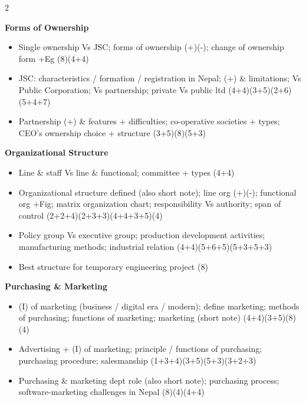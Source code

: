 \documentclass[10pt]{article}
\begin{document}
\begin{multicols}{2}
\begin{itemize}
\end{itemize}
\textbf{Forms of Ownership}
\begin{itemize}
  \item Single ownership Vs JSC; forms of ownership (+)(-); change of ownership form +Eg \hfill (8)(4+4)
  \item JSC: characteristics / formation / registration in Nepal; (+) \& limitations; Vs Public Corporation; Vs partnership; private Vs public ltd \hfill (4+4)(3+5)(2+6)(5+4+7)
  \item Partnership (+) \& features + difficulties; co-operative societies + types; CEO's ownership choice + structure \hfill (3+5)(8)(5+3)
\end{itemize}
\textbf{Organizational Structure}
\begin{itemize}
  \item Line \& staff Vs line \& functional; committee + types \hfill (4+4)
  \item Organizational structure defined (also short note); line org (+)(-); functional org +Fig; matrix organization chart; responsibility Vs authority; span of control \hfill (2+2+4)(2+3+3)(4+4+3+5)(4)
  \item Policy group Vs executive group; production development activities; manufacturing methods; industrial relation \hfill (4+4)(5+6+5)(5+3+5+3)
  \item Best structure for temporary engineering project \hfill (8)
\end{itemize}
\textbf{Purchasing \& Marketing}
\begin{itemize}
  \item (I) of marketing (business / digital era / modern); define marketing; methods of purchasing; functions of marketing; marketing (short note) \hfill (4+4)(3+5)(8)(4)
  \item Advertising + (I) of marketing; principle / functions of purchasing; purchasing procedure; salesmanship \hfill (1+3+4)(3+5)(5+3)(3+2+3)
  \item Purchasing \& marketing dept role (also short note); purchasing process; software-marketing challenges in Nepal \hfill (8)(4)(4+4)
\end{itemize}


\end{multicols}
\end{document}
